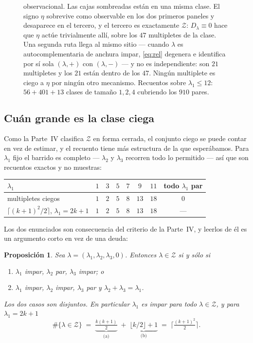 \documentclass[11pt,a4paper]{article}
\newtheorem{proposition}{Proposición}
\begin{document}
\begin{figure}[t]
{observacional. Las cajas sombreadas están en una misma clase. El signo $\eta$ sobrevive como
observable en los dos primeros paneles y desaparece en el tercero, y el tercero es exactamente
$\mathcal Z$: $D_\lambda\equiv0$ hace que $\eta$ actúe trivialmente allí, sobre los $47$ multipletes
de la clase. Una segunda ruta llega al mismo sitio --- cuando $\lambda$ es autocomplementaria de
anchura impar, \eqref{eq:rel} degenera e identifica por sí sola $(\lambda,+)$ con $(\lambda,-)$ --- y
no es independiente: son $21$ multipletes y los $21$ están dentro de los $47$. Ningún multiplete es
ciego a $\eta$ por ningún otro mecanismo. Recuentos sobre $\lambda_1\le12$: $56+401+13$ clases de
tamaño $1,2,4$ cubriendo los $910$ pares.}
\label{fig:fibre}
\end{figure}

\subsection*{Cuán grande es la clase ciega}\label{sec:count}

Como la Parte~IV clasifica $\mathcal Z$ en forma cerrada, el conjunto ciego se puede contar en vez de
estimar, y el recuento tiene más estructura de la que esperábamos. Para $\lambda_1$ fijo el barrido
es completo --- $\lambda_2$ y $\lambda_3$ recorren todo lo permitido --- así que son recuentos
exactos y no muestras:

\begin{center}\small
{}
\begin{tabular}{lccccccc}
\toprule
\rowcolor{hdrblue!12}
$\lambda_1$ & $1$ & $3$ & $5$ & $7$ & $9$ & $11$ & todo $\lambda_1$ par\\
\midrule
multipletes ciegos & $1$ & $2$ & $5$ & $8$ & $13$ & $18$ & \textcolor{warmred}{$0$}\\
$\lceil (k+1)^2/2\rceil$, $\lambda_1=2k{+}1$ & $1$ & $2$ & $5$ & $8$ & $13$ & $18$ & ---\\
\bottomrule
\end{tabular}
\end{center}

\noindent Los dos enunciados son consecuencia del criterio de la Parte~IV, y leerlos de él es un
argumento corto en vez de una deuda:

\begin{proposition}\label{prop:count}
Sea $\lambda=(\lambda_1,\lambda_2,\lambda_3,0)$. Entonces $\lambda\in\mathcal Z$ si y sólo si
\begin{enumerate}\itemsep1pt
\item[(a)] $\lambda_1$ impar, $\lambda_2$ par, $\lambda_3$ impar; \quad o
\item[(b)] $\lambda_1$ impar, $\lambda_2$ impar, $\lambda_3$ par y $\lambda_2+\lambda_3=\lambda_1$.
\end{enumerate}
Los dos casos son disjuntos. En particular $\lambda_1$ es \emph{impar} para todo
$\lambda\in\mathcal Z$, y para $\lambda_1=2k+1$
\[
\#\{\lambda\in\mathcal Z\}\;=\;\underbrace{\tfrac{k(k+1)}{2}}_{\text{(a)}}
\;+\;\underbrace{\lfloor k/2\rfloor+1}_{\text{(b)}}\;=\;\Big\lceil \tfrac{(k+1)^2}{2}\Big\rceil .
\]
\end{proposition}
\end{document}
